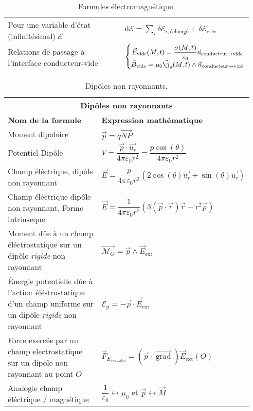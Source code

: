 \documentclass[10pt,a4paper,titlepage,portrait]{article}
\newcommand{\grad}
{
    \vec{\operatorname{grad}}
}
\renewcommand{\arraystretch}{2}
\begin{document}
\begin{table}[H]
\begin{tabular}{@{}p{9cm}p{10cm}@{}}
    Pour une variable d'état (infinitésimal) $\mathcal{E}$ & $\displaystyle \text{d} \mathcal{E} = \sum\limits_{i} \delta\mathcal{E}_{i, \text{échangé}} + \delta \mathcal{E}_{\text{crée}}$ \\ 
    Relations de passage à l'interface conducteur-vide & $\left\{\begin{matrix} \vec{E}_{\text{vide}}(M,t) = \dfrac{\sigma(M,t)}{\varepsilon_0}\vec{n}_{\text{conducteur} \to \text{vide}} \\ \vec{B}_{\text{vide}} = \mu_0 \vec{\j}_s(M,t)\wedge \vec{n}_{\text{conducteur} \to \text{vide}}\end{matrix}\right.$ \\
    \bottomrule
\end{tabular}
\caption{Formules électromagnétique.}
\label{tab:electromag}
\end{table}

\begin{table}[H]
    \centering
    \renewcommand{\arraystretch}{1.5} %
    \setlength{\tabcolsep}{8pt} %
    \begin{tabular}{@{}p{9cm}p{10cm}@{}}
        \toprule
        \multicolumn{2}{c}{\textbf{Dipôles non rayonnants}} \\
        \midrule
        \textbf{Nom de la formule} & \textbf{Expression mathématique} \\
        \midrule
        Moment dipolaire & $\vec p = q \vec{NP}$ \\
        Potentiel Dipôle & $V = \dfrac{\vec{p} \cdot \vec{u_r}}{4\pi \varepsilon_0 r^2} = \dfrac{p\cos(\theta)}{4\pi \varepsilon_0 r^2}$ \\ 
        Champ éléctrique, dipôle non rayonnant & $\vec{E} = \dfrac{p}{4\pi \varepsilon_0 r^3}(2\cos(\theta) \vec{u_r} + \sin(\theta) \vec{u_r})$ \\ 
        Champ éléctrique dipôle non rayonnant, Forme intrinseque & $\vec{E} = \dfrac{1}{4\pi\varepsilon_0 r^5}(3(\vec{p} \cdot \vec{r})\vec{r} - r^2\vec{p})$ \\ 
        Moment dûe à un champ éléctrostatique sur un dipôle \textit{rigide} non rayonnant & $\vec{\mathcal{M}_O}=\vec{p}\wedge \vec{E}_{\text{ext}}$ \\
        Énergie potentielle dûe à l'action éléstrostatique d'un champ uniforme sur un dipôle \textit{rigide} non rayonnant & $\mathcal{E}_{\text{p}} = -\vec{p}\cdot\vec{E}_{\text{ext}}$\\
        Force exercée par un champ electrostatique sur un dipôle non rayonnant au point $O$ & $\vec{F}_{E_{\text{ext}\longrightarrow\text{dip}}} = \left(\vec{p}\cdot\grad\right)\vec{E}_{\text{ext}}(O)$\\
        Analogie champ éléctrique $/$ magnétique & $\dfrac{1}{\varepsilon_0} \longleftrightarrow \mu_0$ et $\vec{p} \longleftrightarrow \vec{M}$ \\
                
    \bottomrule
\end{tabular}
\caption{Dipôles non rayonnants.}
\label{tab:denr}
\end{table}
\end{document}
